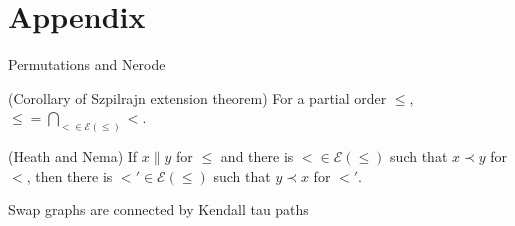 \documentclass{llncs}
\begin{document}
\section{Appendix}

\begin{theorem}
    Permutations and Nerode
\end{theorem}

\begin{theorem}
    (Corollary of Szpilrajn extension theorem) For a partial order $\leq$, $\leq = \bigcap_{< \in \mathcal{E}(\leq)} <$.
\end{theorem}

\begin{theorem}
    (Heath and Nema) If $x \parallel y$ for $\leq$ and there is $< \in \mathcal{E}(\leq)$ such that $x \prec y$ for $<$, then there is $<' \in \mathcal{E}(\leq)$ such that $y \prec x$ for $<'$.
\end{theorem}

\begin{theorem}
    Swap graphs are connected by Kendall tau paths
\end{theorem}
\end{document}
